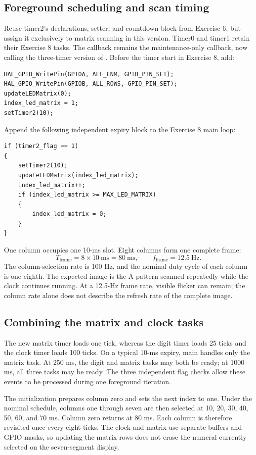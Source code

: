 \documentclass[a4paper]{article}
\newcommand{\code}[1]{\texttt{\detokenize{#1}}}
\newcommand{\topic}[1]{\subsection{#1}}
\begin{document}
\topic{Foreground scheduling and scan timing}
Reuse timer2's declarations, setter, and countdown block from Exercise 6,
but assign it exclusively to matrix scanning in this version. Timer0 and
timer1 retain their Exercise 8 tasks. The callback remains the maintenance-only
callback, now calling the three-timer version of \code{timer_run()}.
Before the timer start in Exercise 8, add:
\par\noindent\begin{minipage}{\linewidth}
\begin{lstlisting}[caption={Matrix initialization before TIM2 starts}]
HAL_GPIO_WritePin(GPIOA, ALL_ENM, GPIO_PIN_SET);
HAL_GPIO_WritePin(GPIOB, ALL_ROWS, GPIO_PIN_SET);
updateLEDMatrix(0);
index_led_matrix = 1;
setTimer2(10);
\end{lstlisting}
\end{minipage}\par
Append the following independent expiry block to the Exercise 8 main loop:
\par\noindent\begin{minipage}{\linewidth}
\begin{lstlisting}[caption={Matrix scan task in main}]
if (timer2_flag == 1)
{
    setTimer2(10);
    updateLEDMatrix(index_led_matrix);
    index_led_matrix++;
    if (index_led_matrix >= MAX_LED_MATRIX)
    {
        index_led_matrix = 0;
    }
}
\end{lstlisting}
\end{minipage}\par
One column occupies one 10-ms slot. Eight columns form one complete frame:
\[
T_{\mathrm{frame}}=8\times10\ \mathrm{ms}=80\ \mathrm{ms},\qquad
f_{\mathrm{frame}}=12.5\ \mathrm{Hz}.
\]
The column-selection rate is 100 Hz, and the nominal duty cycle of each column
is one eighth. The expected image is the A pattern scanned repeatedly while
the clock continues running. At a 12.5-Hz frame rate, visible flicker can remain;
the column rate alone does not describe the refresh rate of the complete image.

\topic{Combining the matrix and clock tasks}
The new matrix timer loads one tick, whereas the digit timer loads 25 ticks
and the clock timer loads 100 ticks. On a typical 10-ms expiry, main handles
only the matrix task. At 250 ms, the digit and matrix tasks may both be ready;
at 1000 ms, all three tasks may be ready. The three independent flag checks
allow these events to be processed during one foreground iteration.

The initialization prepares column zero and sets the next index to one.
Under the nominal schedule, columns one through seven are then selected at
10, 20, 30, 40, 50, 60, and 70 ms. Column zero returns at 80 ms. Each column
is therefore revisited once every eight ticks. The clock and matrix use
separate buffers and GPIO masks, so updating the matrix rows does not erase
the numeral currently selected on the seven-segment display.
\end{document}
